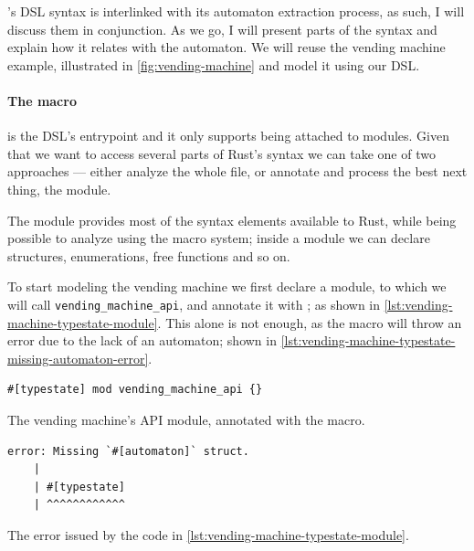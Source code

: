 's DSL syntax is interlinked with its automaton extraction process,
as such, I will discuss them in conjunction.
As we go, I will present parts of the syntax and explain how it relates with the automaton.
We will reuse the vending machine example, illustrated in \autoref{fig:vending-machine} and model it using our DSL.

\paragraph{The  macro} is the DSL's entrypoint and
it only supports being attached to modules.
Given that we want to access several parts of Rust's syntax  we can take one of two approaches ---
either analyze the whole file, or annotate and process the best next thing, the module.

The module provides most of the syntax elements available to  Rust,
while being possible to analyze using the macro system;
inside a module we can declare structures, enumerations, free functions and so on.

To start modeling the vending machine we first declare a module, to which we will call \texttt{vending\_machine\_api},
and annotate it with ; as shown in \autoref{lst:vending-machine-typestate-module}.
This alone is not enough, as the macro will throw an error due to the lack of an automaton; shown in \autoref{lst:vending-machine-typestate-missing-automaton-error}.

\begin{listing}
    \begin{verbatim}
#[typestate] mod vending_machine_api {}
    \end{verbatim}
    \caption{The vending machine's \gls{API} module, annotated with the  macro.}
    \label{lst:vending-machine-typestate-module}
\end{listing}

\begin{listing}
    \begin{verbatim}
error: Missing `#[automaton]` struct.
    |
    | #[typestate]
    | ^^^^^^^^^^^^
    \end{verbatim}
    \caption{The error issued by the code in \autoref{lst:vending-machine-typestate-module}.}
    \label{lst:vending-machine-typestate-missing-automaton-error}
\end{listing}

